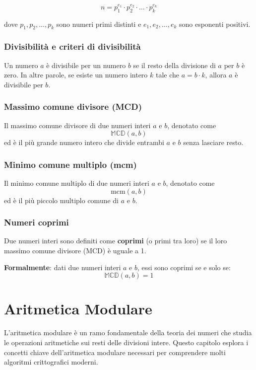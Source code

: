 \documentclass[a4paper,12pt]{report}
\begin{document}
\[ n = p_1^{e_1} \cdot p_2^{e_2} \cdot \ldots \cdot p_k^{e_k} \]

dove \( p_1, p_2, \ldots, p_k \) sono numeri primi distinti e \( e_1, e_2, \ldots, e_k \) sono esponenti positivi.

\subsection*{Divisibilità e criteri di divisibilità}

Un numero \(a\) è divisibile per un numero \(b\) se il resto della divisione di \(a\) per \(b\) è zero. In altre parole, se esiste un numero intero \(k\) tale che \(a = b \cdot k\), allora \(a\) è divisibile per \(b\).

\subsection*{Massimo comune divisore (MCD)}
Il massimo comune divisore di due numeri interi \( a \) e \( b \), denotato come 
\[ \mathbb{MCD}(a, b) \] 
ed è il più grande numero intero che divide entrambi \( a \) e \( b \) senza lasciare resto.

\subsection*{Minimo comune multiplo (mcm)}
Il minimo comune multiplo di due numeri interi \( a \) e \( b \), denotato come 
\[ \mathrm{mcm}(a, b) \]
ed è il più piccolo multiplo comune di \( a \) e \( b \).

\subsection*{Numeri coprimi}
Due numeri interi sono definiti come \textbf{coprimi} (o primi tra loro) se il loro massimo comune divisore (MCD) è uguale a 1. 

\textbf{Formalmente}: dati due numeri interi \(a\) e \(b\), essi sono coprimi se e solo se:
\[\mathbb{MCD}(a, b) = 1\]

\chapter{Aritmetica Modulare}

L'aritmetica modulare è un ramo fondamentale della teoria dei numeri che studia le operazioni aritmetiche sui resti delle divisioni intere. Questo capitolo esplora i concetti chiave dell'aritmetica modulare necessari per comprendere molti algoritmi crittografici moderni.
\end{document}
